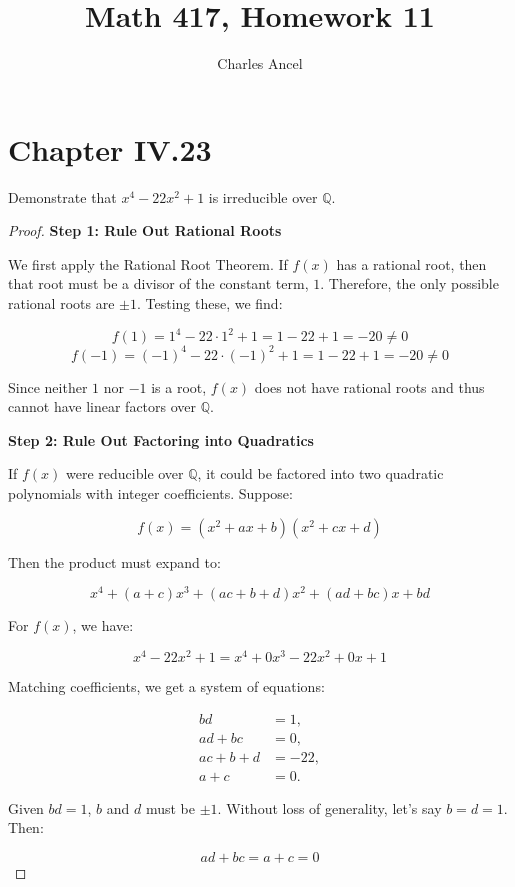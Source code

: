 \documentclass[12pt]{amsart}
\title{Math 417, Homework 11}
\author{Charles Ancel}
\theoremstyle{definition}
\numberwithin{equation}{section}
\theoremstyle{plain}
\newcommand{\Q}{\mathbb{Q}}
\begin{document}
\maketitle
\section*{Chapter IV.23}
\begin{exercise}{17} Demonstrate that $x^4 - 22x^2 + 1$ is irreducible over $\Q$.

\begin{proof}
\textbf{Step 1: Rule Out Rational Roots}

We first apply the Rational Root Theorem. If \( f(x) \) has a rational root, then that root must be a divisor of the constant term, \( 1 \). Therefore, the only possible rational roots are \( \pm1 \). Testing these, we find:

\[
f(1) = 1^4 - 22 \cdot 1^2 + 1 = 1 - 22 + 1 = -20 \neq 0
\]
\[
f(-1) = (-1)^4 - 22 \cdot (-1)^2 + 1 = 1 - 22 + 1 = -20 \neq 0
\]

Since neither \( 1 \) nor \( -1 \) is a root, \( f(x) \) does not have rational roots and thus cannot have linear factors over \( \mathbb{Q} \).

\textbf{Step 2: Rule Out Factoring into Quadratics}

If \( f(x) \) were reducible over \( \mathbb{Q} \), it could be factored into two quadratic polynomials with integer coefficients. Suppose:

\[
f(x) = (x^2 + ax + b)(x^2 + cx + d)
\]

Then the product must expand to:

\[
x^4 + (a+c)x^3 + (ac + b + d)x^2 + (ad + bc)x + bd
\]

For \( f(x) \), we have:

\[
x^4 - 22x^2 + 1 = x^4 + 0x^3 - 22x^2 + 0x + 1
\]

Matching coefficients, we get a system of equations:

\begin{align*}
bd &= 1, \\
ad + bc &= 0, \\
ac + b + d &= -22, \\
a + c &= 0.
\end{align*}

Given \( bd = 1 \), \( b \) and \( d \) must be \( \pm1 \). Without loss of generality, let's say \( b = d = 1 \). Then:

\[
ad + bc = a + c = 0
\]


\end{proof}
\end{exercise}
\end{document}
